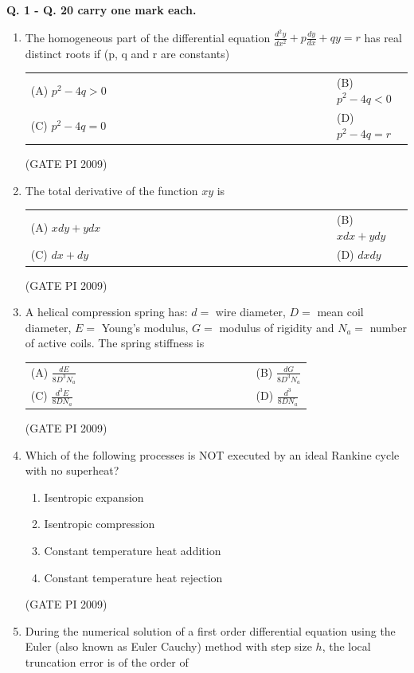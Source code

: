 \documentclass[journal,12pt,onecolumn]{IEEEtran}
\theoremstyle{remark}
\begin{document}
\newpage
 
\textbf{Q. 1 - Q. 20 carry one mark each.}

\begin{enumerate}[label=Q.\arabic*, leftmargin=*]

\item The homogeneous part of the differential equation
$\frac{d^2 y}{dx^2} + p \frac{dy}{dx} + q y = r$
has real distinct roots if (p, q and r are constants)
\begin{multicols}{2}
\begin{tabular}[t]{p{0.8\linewidth} p{0.9\linewidth}}
(A) $p^2 - 4q > 0$ & (B) $p^2 - 4q < 0$ \\
(C) $p^2 - 4q = 0$ & (D) $p^2 - 4q = r$ \\
\end{tabular}
\end{multicols}
\hfill (GATE PI 2009) 
\item The total derivative of the function $xy$ is
\begin{multicols}{2}
\begin{tabular}[t]{p{0.8\linewidth} p{0.9\linewidth}}
(A) $x dy + ydx$ & (B) $xdx + ydy$ \\
(C) $dx + dy$ & (D) $dx dy$ \\
\end{tabular}
\end{multicols}
\hfill (GATE PI 2009) 
\item A helical compression spring has: \( d = \) wire diameter, \( D = \) mean coil diameter, \( E = \) Young's modulus, \( G = \) modulus of rigidity and \( N_a = \) number of active coils. The spring stiffness is
\begin{multicols}{2}
\begin{tabular}[t]{p{0.8\linewidth} p{0.9\linewidth}}
(A) $\frac{d E}{8 D^{3} N_a}$ & (B) $\frac{d G}{8 D^{3} N_a}$ \\
(C) $\frac{d^{3} E}{8 D N_a}$ & (D) $\frac{d^{3}}{8 D N_a}$ \\
\end{tabular}
\end{multicols}
\hfill (GATE PI 2009)
\item Which of the following processes is NOT executed by an ideal Rankine cycle with no superheat?
\begin{enumerate}[label=(\Alph*)]
\item Isentropic expansion
\item Isentropic compression
\item Constant temperature heat addition
\item Constant temperature heat rejection
\end{enumerate}
\hfill (GATE PI 2009)
\item During the numerical solution of a first order differential equation using the Euler (also known as Euler Cauchy) method with step size \(h\), the local truncation error is of the order of


\end{enumerate}
\end{document}
